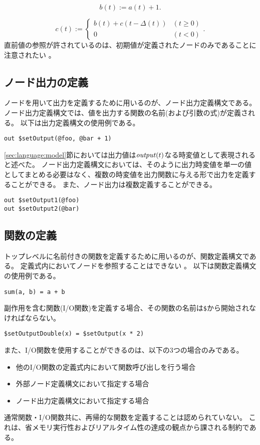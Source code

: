 \begin{equation*}
  b(t) := a(t) + 1.
\end{equation*}

\begin{equation*}
  c(t) := \begin{cases}
    b(t) + c(t-\Delta(t)) & (t \geq 0) \\
    0 & (t < 0)
  \end{cases}.
\end{equation*}
直前値の参照が許されているのは、初期値が定義されたノードのみであることに注意されたい \footnotemark[1]。

\subsection{ノード出力の定義}
ノードを用いて出力を定義するために用いるのが、ノード出力定義構文である。
ノード出力定義構文では、値を出力する関数の名前(および引数の式)が定義される。
以下は出力定義構文の使用例である。
\begin{lstlisting}[basicstyle=\ttfamily\small,language=SFRP]
out $setOutput(@foo, @bar + 1)
\end{lstlisting}
\ref{sec:language:model}節においては出力値は${\it output}(t)$なる時変値として表現されると述べた。
ノード出力定義構文においては、そのように出力時変値を単一の値としてまとめる必要はなく、複数の時変値を出力関数に与える形で出力を定義することができる。
また、ノード出力は複数定義することができる。
\begin{lstlisting}[basicstyle=\ttfamily\small,language=SFRP]
out $setOutput1(@foo)
out $setOutput2(@bar)
\end{lstlisting}

\subsection{関数の定義}
トップレベルに名前付きの関数を定義するために用いるのが、関数定義構文である。
定義式内においてノードを参照することはできない \footnotemark[1]。
以下は関数定義構文の使用例である。
\begin{lstlisting}[basicstyle=\ttfamily\small,language=SFRP]
sum(a, b) = a + b
\end{lstlisting}
副作用を含む関数(I/O関数)を定義する場合、その関数の名前は\texttt{\$}から開始されなければならない。
\begin{lstlisting}[basicstyle=\ttfamily\small,language=SFRP]
$setOutputDouble(x) = $setOutput(x * 2)
\end{lstlisting}
また、I/O関数を使用することができるのは、以下の3つの場合のみである。
\begin{itemize}
  \item 他のI/O関数の定義式内において関数呼び出しを行う場合
  \item 外部ノード定義構文において指定する場合
  \item ノード出力定義構文において指定する場合
\end{itemize}
通常関数・I/O関数共に、再帰的な関数を定義することは認められていない。
これは、省メモリ実行性およびリアルタイム性の達成の観点から課される制約である。

